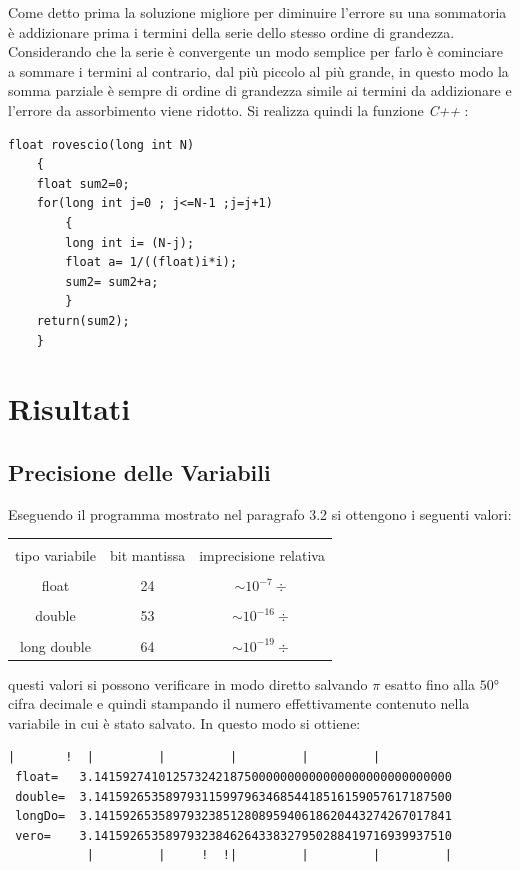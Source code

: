 \documentclass{article}
\begin{document}
Come detto prima la soluzione migliore per diminuire l'errore su una sommatoria è addizionare prima i termini della serie dello stesso ordine di grandezza.
Considerando che la serie è convergente un modo semplice per farlo è cominciare a sommare i termini al contrario, dal più piccolo al più grande, in questo modo la somma parziale è sempre di ordine di grandezza simile ai termini da addizionare e l'errore da assorbimento viene ridotto.
Si realizza quindi la funzione \emph{C++} :

\begin{lstlisting}[frame=single]
float rovescio(long int N)
	{
	float sum2=0;
	for(long int j=0 ; j<=N-1 ;j=j+1)
		{
		long int i= (N-j);
		float a= 1/((float)i*i);
		sum2= sum2+a;
		}
	return(sum2);
	}
\end{lstlisting}

\section{Risultati}

\subsection{Precisione delle Variabili}

Eseguendo il programma mostrato nel paragrafo 3.2 si ottengono i seguenti valori:
\begin{center}
\begin{tabular}{|c|c|c|}
\hline
& \\tipo variabile & bit mantissa & imprecisione relativa \\
\hline
& \\float & 24 & $\sim 10^{-7} \div$ \\
\hline
& \\double & 53 & $\sim 10^{-16} \div$ \\
\hline
& \\long double & 64 & $\sim 10^{-19} \div$ \\
\hline
\end{tabular}
\end{center}

questi valori si possono verificare in modo diretto salvando $\pi$ esatto fino alla $50°$ cifra decimale e quindi stampando il numero effettivamente contenuto nella variabile in cui è stato salvato.
In questo modo si ottiene:

\begin{lstlisting}[frame=single]
          |       !  |         |         |         |         |
 float=   3.14159274101257324218750000000000000000000000000000
 double=  3.14159265358979311599796346854418516159057617187500
 longDo=  3.14159265358979323851280895940618620443274267017841
 vero=    3.14159265358979323846264338327950288419716939937510
           |         |     !  !|         |         |         |
\end{lstlisting}
\end{document}
